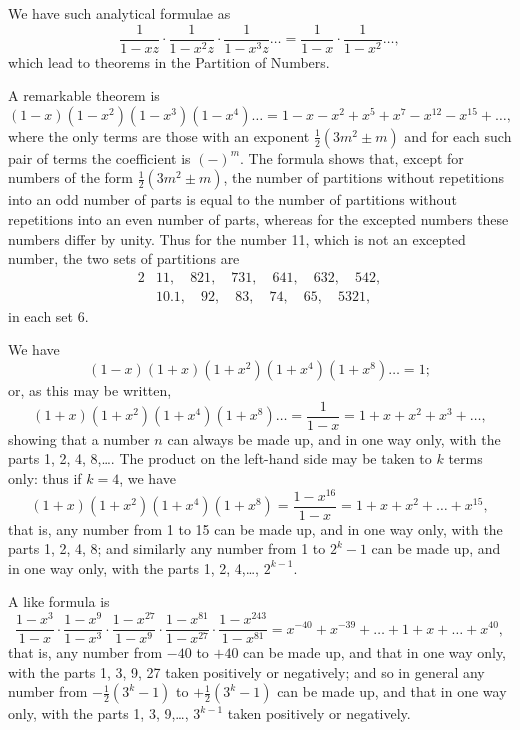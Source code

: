 \documentclass[11pt,a4paper]{article}
\begin{document}
We have such analytical formulae as
\[
\frac{1}{1 - xz} \cdot \frac{1}{1 - x^{2}z} \cdot \frac{1}{1 - x^{3}z} \ldots = \frac{1}{1 - x} \cdot \frac{1}{1 - x^{2}} \ldots,
\]
which lead to theorems in the Partition of Numbers.

A remarkable theorem is
\[
(1 - x)(1 - x^{2})(1 - x^{3})(1 - x^{4})\ldots = 1 - x - x^{2} + x^{5} + x^{7} - x^{12} - x^{15} + \ldots,
\]
where the only terms are those with an exponent $\frac{1}{2}(3m^{2} \pm m)$ and for each such pair of terms the coefficient is $(-)^{m}$. The formula shows that, except for numbers of the form $\frac{1}{2}(3m^{2} \pm m)$, the number of partitions without repetitions into an odd number of parts is equal to the number of partitions without repetitions into an even number of parts, whereas for the excepted numbers these numbers differ by unity. Thus for the number 11, which is not an excepted number, the two sets of partitions are
\begin{alignat*}{2}
&11, \quad 821, \quad 731, \quad 641, \quad 632, \quad 542, \\
&10.1, \quad 92, \quad 83, \quad 74, \quad 65, \quad 5321,
\end{alignat*}
in each set 6.

We have
\[
(1 - x)(1 + x)(1 + x^{2})(1 + x^{4})(1 + x^{8})\ldots = 1;
\]
or, as this may be written,
\[
(1 + x)(1 + x^{2})(1 + x^{4})(1 + x^{8})\ldots = \frac{1}{1 - x} = 1 + x + x^{2} + x^{3} + \ldots,
\]
showing that a number $n$ can always be made up, and in one way only, with the parts 1, 2, 4, 8,\ldots. The product on the left-hand side may be taken to $k$ terms only: thus if $k = 4$, we have
\[
(1 + x)(1 + x^{2})(1 + x^{4})(1 + x^{8}) = \frac{1 - x^{16}}{1 - x} = 1 + x + x^{2} + \ldots + x^{15},
\]
that is, any number from 1 to 15 can be made up, and in one way only, with the parts 1, 2, 4, 8; and similarly any number from 1 to $2^{k} - 1$ can be made up, and in one way only, with the parts 1, 2, 4,\ldots, $2^{k-1}$.

A like formula is
\[
\frac{1 - x^{3}}{1 - x} \cdot \frac{1 - x^{9}}{1 - x^{3}} \cdot \frac{1 - x^{27}}{1 - x^{9}} \cdot \frac{1 - x^{81}}{1 - x^{27}} \cdot \frac{1 - x^{243}}{1 - x^{81}} = x^{-40} + x^{-39} + \ldots + 1 + x + \ldots + x^{40},
\]
that is, any number from $-40$ to $+40$ can be made up, and that in one way only, with the parts 1, 3, 9, 27 taken positively or negatively; and so in general any number from $-\frac{1}{2}(3^{k} - 1)$ to $+\frac{1}{2}(3^{k} - 1)$ can be made up, and that in one way only, with the parts 1, 3, 9,\ldots, $3^{k-1}$ taken positively or negatively.
\end{document}
